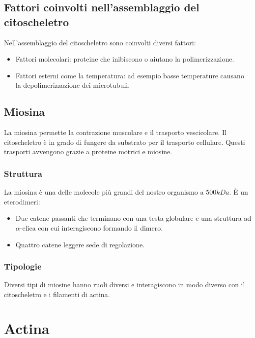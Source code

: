 	\subsection{Fattori coinvolti nell'assemblaggio del citoscheletro}
	Nell'assemblaggio del citoscheletro sono coinvolti diversi fattori:
	\begin{multicols}{2}
		\begin{itemize}
			\item Fattori molecolari: proteine che inibiscono o aiutano la polimerizzazione.
			\item Fattori esterni come la temperatura: ad esempio basse temperature causano la depolimerizzazione dei microtubuli.
		\end{itemize}
	\end{multicols}

	\subsection{Miosina}
	La miosina permette la contrazione muscolare e il trasporto vescicolare.
	Il citoscheletro \`e in grado di fungere da substrato per il trasporto cellulare.
	Questi trasporti avvengono grazie a proteine motrici e miosine.
	
		\subsubsection{Struttura}
		La miosina \`e una delle molecole pi\`u grandi del nostro organismo a $500kDa$.
		\`E un eterodimeri:
		\begin{multicols}{2}
			\begin{itemize}
				\item Due catene passanti che terminano con una testa globulare e una struttura ad $\alpha$-elica con cui interagiscono formando il dimero.
				\item Quattro catene leggere sede di regolazione.
			\end{itemize}
		\end{multicols}

		\subsubsection{Tipologie}
		Diversi tipi di miosine hanno ruoli diversi e interagiscono in modo diverso con il citoscheletro e i filamenti di actina.

\section{Actina}

